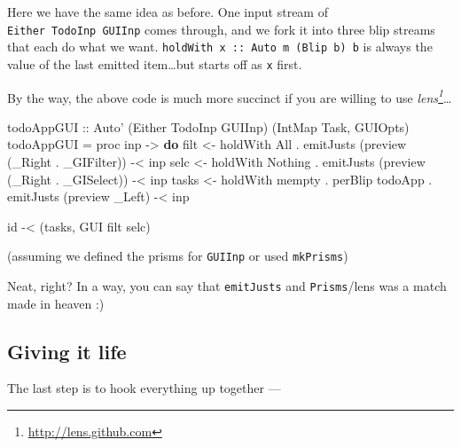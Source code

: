 \documentclass[]{article}
\newenvironment{Shaded}{}{}
\newcommand{\KeywordTok}[1]{\textcolor[rgb]{0.00,0.44,0.13}{\textbf{{#1}}}}
\newcommand{\DataTypeTok}[1]{\textcolor[rgb]{0.56,0.13,0.00}{{#1}}}
\newcommand{\OtherTok}[1]{\textcolor[rgb]{0.00,0.44,0.13}{{#1}}}
\newcommand{\FunctionTok}[1]{\textcolor[rgb]{0.02,0.16,0.49}{{#1}}}
\newcommand{\NormalTok}[1]{{#1}}
\renewcommand{\href}[2]{#2\footnote{\url{#1}}}
\begin{document}
Here we have the same idea as before. One input stream of
\texttt{Either\ TodoInp\ GUIInp} comes through, and we fork it into three blip
streams that each do what we want.
\texttt{holdWith\ x\ ::\ Auto\ m\ (Blip\ b)\ b} is always the value of the last
emitted item\ldots{}but starts off as \texttt{x} first.

By the way, the above code is much more succinct if you are willing to use
\emph{\href{http://lens.github.com}{lens}}\ldots{}

\begin{Shaded}
\begin{Highlighting}[]
\OtherTok{todoAppGUI ::} \DataTypeTok{Auto'} \NormalTok{(}\DataTypeTok{Either} \DataTypeTok{TodoInp} \DataTypeTok{GUIInp}\NormalTok{) (}\DataTypeTok{IntMap} \DataTypeTok{Task}\NormalTok{, }\DataTypeTok{GUIOpts}\NormalTok{)}
\NormalTok{todoAppGUI }\FunctionTok{=} \NormalTok{proc inp }\OtherTok{->} \KeywordTok{do}
    \NormalTok{filt  }\OtherTok{<-} \NormalTok{holdWith }\DataTypeTok{All}
           \FunctionTok{.} \NormalTok{emitJusts (preview (_}\DataTypeTok{Right} \FunctionTok{.} \NormalTok{_}\DataTypeTok{GIFilter}\NormalTok{)) }\FunctionTok{-<} \NormalTok{inp}
    \NormalTok{selc  }\OtherTok{<-} \NormalTok{holdWith }\DataTypeTok{Nothing}
           \FunctionTok{.} \NormalTok{emitJusts (preview (_}\DataTypeTok{Right} \FunctionTok{.} \NormalTok{_}\DataTypeTok{GISelect}\NormalTok{)) }\FunctionTok{-<} \NormalTok{inp}
    \NormalTok{tasks }\OtherTok{<-} \NormalTok{holdWith mempty }\FunctionTok{.} \NormalTok{perBlip todoApp}
           \FunctionTok{.} \NormalTok{emitJusts (preview _}\DataTypeTok{Left}\NormalTok{)                }\FunctionTok{-<} \NormalTok{inp}

    \NormalTok{id }\FunctionTok{-<} \NormalTok{(tasks, }\DataTypeTok{GUI} \NormalTok{filt selc)}
\end{Highlighting}
\end{Shaded}

(assuming we defined the prisms for \texttt{GUIInp} or used
\texttt{\textquotesingle{}\textquotesingle{}mkPrisms})

Neat, right? In a way, you can say that \texttt{emitJusts} and
\texttt{Prisms}/lens was a match made in heaven :)

\subsection{Giving it life}\label{giving-it-life}

The last step is to hook everything up together ---
\end{document}
